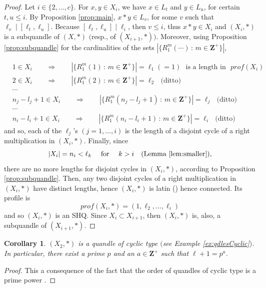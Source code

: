 \documentclass{article}
\newtheorem{corollary}[theorem]{Corollary}
\begin{document}
\begin{proof}
Let $i\in\{2,\dots,c\}$. For $x,y\in X_i$, we have $x\in L_t$ and $y\in L_u$, for certain $t,u\leq i$. By Proposition \ref{prop:main}, $x*y\in L_v$, for some $v$ such that $\ell_v\mid[\ell_t,\ell_u]$. Because $[\ell_t,\ell_u]\mid \ell_i$, then $v\leq i$, thus $x\ast y\in X_i$ and $(X_i,*)$ is a subquandle of $(X,*)$ $($resp., of $(X_{i+1},*))$.  Moreover, using Proposition \ref{prop:subquandle} for the cardinalities of the sets $|\{R_1^m(\cdots ) \, : \, m\in \mathbf{Z}^+    \}|$,

\begin{align*}
&1\in X_i \qquad \Longrightarrow \qquad |\{R_1^m(1) \, : \, m\in \mathbf{Z}^+    \}|=\ell_1(=1)\,\, \text{ is a length in }\,\, prof(X_i)\\
&2\in X_i\qquad \Longrightarrow \qquad |\{R_1^m(2) \, : \, m\in \mathbf{Z}^+    \}|=\ell_2\,\, \text{ (ditto)}\\
& \cdots \\
& n_j-l_j+1 \in X_i \qquad  \Longrightarrow \qquad |\{R_1^m(n_j-l_j+1) \, : \, m\in \mathbf{Z}^+    \}|=\ell_j\,\, \text{ (ditto)}\\
& \cdots  \\
& n_i-l_i+1 \in X_i\qquad \Longrightarrow  \qquad |\{R_1^m(n_i-l_i+1) \, : \, m\in \mathbf{Z}^+    \}|=\ell_i \,\, \text{ (ditto)}
\end{align*} and so, each of the $\ell_j$'s $(j=1, \dots , i)$ is the length of a disjoint cycle of a right multiplication in $(X_i,*)$. Finally, since $$|X_i|=n_i<\ell_k \quad \text{ for }\quad k>i \quad \text{$($Lemma }\ref{lem:smaller}),$$ there are no more lengths for disjoint cycles in $(X_i, *)$, according to Proposition \ref{prop:subquandle}. Then, any two disjoint cycles of a right multiplication in $(X_i, *)$ have distinct lengths, hence $(X_i, *)$ is latin (\cite{Lages_Lopes_Vojtěchovský}) hence connected. Its profile is $$prof(X_i, *)=(1, \ell_2, \dots , \ell_i)$$ and so $(X_i, *)$ is an SHQ. Since $X_i\subset X_{i+1}$, then $(X_i, *)$ is, also, a subquandle of $(X_{i+1}, *)$.
\end{proof}

\begin{corollary}\label{cor:X2}
$(X_2, *)$ is a quandle of cyclic type $($see Example \ref{ex:qdlesCyclic}$)$. In particular, there exist a prime $p$ and an $a\in\mathbf{Z}^+$ such that $\ell +1=p^a$.
\end{corollary}
\begin{proof}
This a consequence of the fact that the order of quandles of cyclic type is a prime power \cite{Vendramin_1}.
\end{proof}
\end{document}
